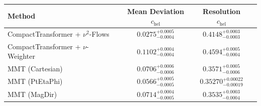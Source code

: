     \begin{tabular}{lccc}
        \toprule
        Method & Mean Deviation $c_{\text{hel}}$ & Resolution $c_{\text{hel}}$ \\
        \midrule
        CompactTransformer + $\nu^2$-Flows & $0.0275^{+0.0005}_{-0.0004}$ & $0.4148^{+0.0003}_{-0.0003}$ \\
        CompactTransformer + $\nu$-Weighter & $0.1102^{+0.0004}_{-0.0004}$ & $0.4594^{+0.0005}_{-0.0004}$ \\
        MMT (Cartesian) & $0.0706^{+0.0006}_{-0.0006}$ & $0.3571^{+0.0005}_{-0.0006}$ \\
        MMT (PtEtaPhi) & $0.0566^{+0.0005}_{-0.0005}$ & $0.35270^{+0.00022}_{-0.00019}$ \\
        MMT (MagDir) & $0.0714^{+0.0004}_{-0.0005}$ & $0.3535^{+0.0003}_{-0.0004}$ \\
        \bottomrule
    \end{tabular}